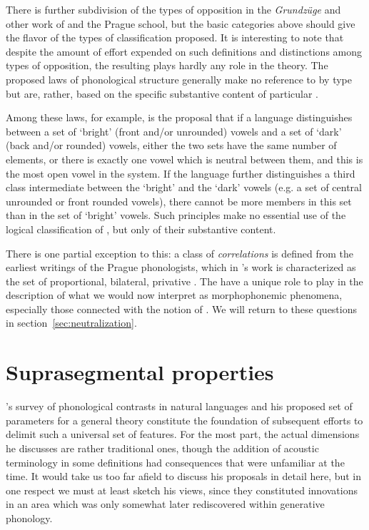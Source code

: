 There is further subdivision of the types of opposition in the
\textsl{Grundzüge} and other work of {\Trubetzkoy} and the Prague school,
but the basic categories above should give the flavor of the types of
classification proposed. It is interesting to note that despite the
amount of effort expended on such definitions and distinctions among
types of opposition, the resulting  plays hardly any role in
the theory. The proposed laws of phonological structure generally make
no reference to  by type but are, rather, based on the
specific substantive content of particular .

Among these laws, for example, is the proposal that if a language
distinguishes between a set of `bright' (front and/or unrounded)
vowels and a set of `dark' (back and/or rounded) vowels, either the
two sets have the same number of elements, or there is exactly one
vowel which is neutral between them, and this is the most open vowel
in the system. If the language further distinguishes a third class
intermediate between the `bright' and the `dark' vowels (e.g. a set of
central unrounded or front rounded vowels), there cannot be more
members in this set than in the set of `bright' vowels. Such
principles make no essential use of the logical classification of
, but only of their substantive content.

There is one partial exception to this: a class of \emph{correlations}
is defined from the earliest writings of the Prague phonologists,
which in {\Trubetzkoy}'s work is characterized as the set of
proportional, bilateral, privative . The  have
a unique role to play in the description of what we would now
interpret as morphophonemic phenomena, especially those connected with
the notion of . We will return to these questions in
section~\ref{sec:neutralization}.

\section{Suprasegmental properties}

{\Trubetzkoy}'s survey of phonological contrasts in natural languages and
his proposed set of parameters for a general theory constitute the
foundation of subsequent efforts to delimit such a universal set of
features. For the most part, the actual dimensions he discusses are
rather traditional ones, though the addition of acoustic terminology
in some definitions had consequences that were unfamiliar at the
time. It would take us too far afield to discuss his proposals in
detail here, but in one respect we must at least sketch his views,
since they constituted innovations in an area which was only somewhat
later rediscovered within generative phonology.

